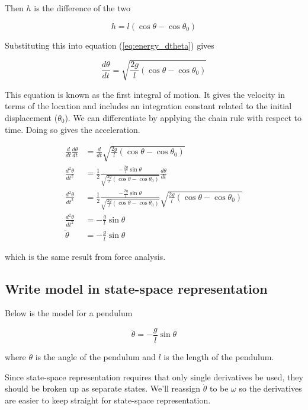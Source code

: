 Then $h$ is the difference of the two

\begin{equation*}
  h = l(\cos\theta - \cos\theta_0)
\end{equation*}

Substituting this into equation (\ref{eq:energy_dtheta}) gives

\begin{equation*}
  \frac{d\theta}{dt} = \sqrt{\frac{2g}{l}(\cos\theta - \cos\theta_0)}
\end{equation*}

This equation is known as the first integral of motion. It gives the velocity in
terms of the location and includes an integration constant related to the
initial displacement ($\theta_0$). We can differentiate by applying the chain
rule with respect to time. Doing so gives the acceleration.

\begin{align*}
  \frac{d}{dt}\frac{d\theta}{dt} &=
    \frac{d}{dt}\sqrt{\frac{2g}{l}(\cos\theta - \cos\theta_0)} \\
  \frac{d^2\theta}{dt^2} &= \frac{1}{2}\frac
    {-\frac{2g}{l}\sin\theta}
    {\sqrt{\frac{2g}{l}(\cos\theta - \cos\theta_0)}}\frac{d\theta}{dt} \\
  \frac{d^2\theta}{dt^2} &= \frac{1}{2}\frac
    {-\frac{2g}{l}\sin\theta}
    {\sqrt{\frac{2g}{l}(\cos\theta - \cos\theta_0)}}
    \sqrt{\frac{2g}{l}(\cos\theta - \cos\theta_0)} \\
  \frac{d^2\theta}{dt^2} &= -\frac{g}{l}\sin\theta \\
  \ddot{\theta} &= -\frac{g}{l}\sin\theta
\end{align*}

which is the same result from force analysis.

\subsection{Write model in state-space representation}

Below is the \gls{model} for a pendulum

\begin{equation*}
  \ddot{\theta} = -\frac{g}{l}\sin\theta
\end{equation*}

where $\theta$ is the angle of the pendulum and $l$ is the length of the
pendulum.

Since state-space representation requires that only single derivatives be used,
they should be broken up as separate states. We'll reassign $\dot{\theta}$ to be
$\omega$ so the derivatives are easier to keep straight for state-space
representation.

